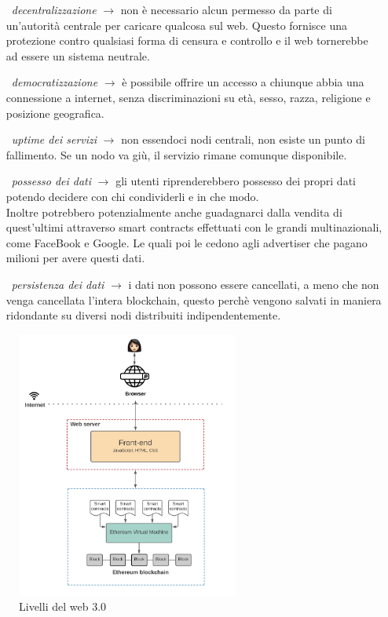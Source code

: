 \begin{adjustwidth}{2cm}{0pt}
    \begin{itemize}
        \item [\textbullet\ \textit{decentralizzazione} $\rightarrow$ ] non è necessario alcun permesso da parte di un'autorità centrale per caricare qualcosa sul web. Questo fornisce una protezione contro qualsiasi forma di censura e controllo e il web tornerebbe ad essere un sistema neutrale.
        \item [\textbullet\ \textit{democratizzazione} $\rightarrow$ ] è possibile offrire un accesso a chiunque abbia una connessione a internet, senza discriminazioni su età, sesso, razza, religione e posizione geografica.
        \item [\textbullet\ \textit{uptime dei servizi} $\rightarrow$ ] non essendoci nodi centrali, non esiste un punto di fallimento. Se un nodo va giù, il servizio rimane comunque disponibile.
        \item [\textbullet\ \textit{possesso dei dati} $\rightarrow$ ] gli utenti riprenderebbero possesso dei propri dati potendo decidere con chi condividerli e in che modo. 
        \\Inoltre potrebbero potenzialmente anche guadagnarci dalla vendita di quest'ultimi attraverso smart contracts effettuati con le grandi multinazionali, come FaceBook e Google. Le quali poi le cedono agli advertiser che pagano milioni per avere questi dati.
        \item [\textbullet\ \textit{persistenza dei dati} $\rightarrow$ ] i dati non possono essere cancellati, a meno che non venga cancellata l'intera blockchain, questo perchè vengono salvati in maniera ridondante su diversi nodi distribuiti indipendentemente.
    \end{itemize}
\end{adjustwidth}
\begin{figure}[h]
    \caption{Livelli del web 3.0}
    \centering
    \includegraphics[width=0.65\textwidth]{Immagini/web_30.png}
\end{figure}
